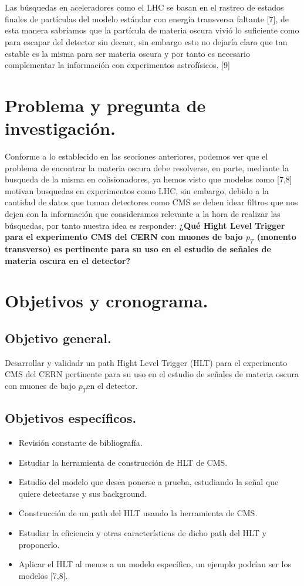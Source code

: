 \\
\\
Las búsquedas en aceleradores como el LHC se basan en el rastreo de estados finales de partículas del modelo estándar con energía transversa faltante [7], de esta manera sabríamos que la partícula de materia oscura vivió lo suficiente como para escapar del detector sin decaer, sin embargo esto no dejaría claro que tan estable es la misma para ser materia oscura y por tanto es necesario complementar la información con experimentos astrofísicos. [9]
\newpage
\section{Problema y pregunta de investigación.}

	Conforme a lo establecido en las secciones anteriores, podemos ver que el problema de encontrar la materia oscura debe resolverse, en parte, mediante la busqueda de la misma en colisionadores, ya hemos visto que modelos como [7,8] motivan busquedas en experimentos como LHC, sin embargo, debido a la cantidad de datos que toman detectores como CMS se deben idear filtros que nos dejen con la información que consideramos relevante a la hora de realizar las búsquedas, por tanto nuestra idea es responder: \textbf{¿Qué Hight Level Trigger para el experimento CMS del CERN con muones de bajo $p_T$ (monento transverso) es pertinente para su uso en el estudio de señales de materia oscura en el detector?}


\newpage
\section{Objetivos y cronograma.}


\subsection{Objetivo general.}

Desarrollar y validadr un path Hight Level Trigger (HLT) para el experimento CMS del CERN pertinente para su uso en el estudio de señales de materia oscura con muones de bajo $p_T$en el detector.

\subsection{Objetivos específicos.}

\begin{itemize}
	\item Revisión constante de bibliografía.
	\item Estudiar la herramienta de construcción de HLT de CMS.
	\item Estudio del modelo que desea ponerse a prueba, estudiando la señal que quiere detectarse y sus background.
	\item Construcción de un path del HLT usando la herramienta de CMS.
	\item Estudiar la eficiencia y otras características de dicho path del HLT y proponerlo.
	\item Aplicar el HLT al menos a un modelo específico, un ejemplo podrían ser los modelos [7,8].
\end{itemize}


